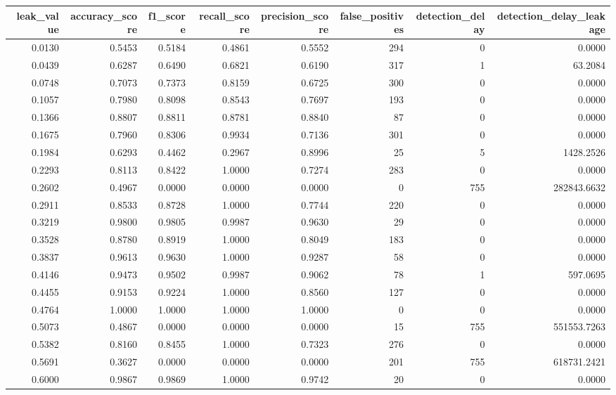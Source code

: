 \begin{tabular}{rrrrrrrr}
\toprule
leak\_value & accuracy\_score & f1\_score & recall\_score & precision\_score & false\_positives & detection\_delay & detection\_delay\_leakage \\
\midrule
0.0130 & 0.5453 & 0.5184 & 0.4861 & 0.5552 & 294 & 0 & 0.0000 \\
0.0439 & 0.6287 & 0.6490 & 0.6821 & 0.6190 & 317 & 1 & 63.2084 \\
0.0748 & 0.7073 & 0.7373 & 0.8159 & 0.6725 & 300 & 0 & 0.0000 \\
0.1057 & 0.7980 & 0.8098 & 0.8543 & 0.7697 & 193 & 0 & 0.0000 \\
0.1366 & 0.8807 & 0.8811 & 0.8781 & 0.8840 & 87 & 0 & 0.0000 \\
0.1675 & 0.7960 & 0.8306 & 0.9934 & 0.7136 & 301 & 0 & 0.0000 \\
0.1984 & 0.6293 & 0.4462 & 0.2967 & 0.8996 & 25 & 5 & 1428.2526 \\
0.2293 & 0.8113 & 0.8422 & 1.0000 & 0.7274 & 283 & 0 & 0.0000 \\
0.2602 & 0.4967 & 0.0000 & 0.0000 & 0.0000 & 0 & 755 & 282843.6632 \\
0.2911 & 0.8533 & 0.8728 & 1.0000 & 0.7744 & 220 & 0 & 0.0000 \\
0.3219 & 0.9800 & 0.9805 & 0.9987 & 0.9630 & 29 & 0 & 0.0000 \\
0.3528 & 0.8780 & 0.8919 & 1.0000 & 0.8049 & 183 & 0 & 0.0000 \\
0.3837 & 0.9613 & 0.9630 & 1.0000 & 0.9287 & 58 & 0 & 0.0000 \\
0.4146 & 0.9473 & 0.9502 & 0.9987 & 0.9062 & 78 & 1 & 597.0695 \\
0.4455 & 0.9153 & 0.9224 & 1.0000 & 0.8560 & 127 & 0 & 0.0000 \\
0.4764 & 1.0000 & 1.0000 & 1.0000 & 1.0000 & 0 & 0 & 0.0000 \\
0.5073 & 0.4867 & 0.0000 & 0.0000 & 0.0000 & 15 & 755 & 551553.7263 \\
0.5382 & 0.8160 & 0.8455 & 1.0000 & 0.7323 & 276 & 0 & 0.0000 \\
0.5691 & 0.3627 & 0.0000 & 0.0000 & 0.0000 & 201 & 755 & 618731.2421 \\
0.6000 & 0.9867 & 0.9869 & 1.0000 & 0.9742 & 20 & 0 & 0.0000 \\
\bottomrule
\end{tabular}
